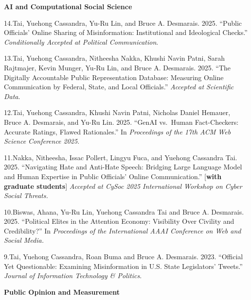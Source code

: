 \documentclass[10.5pt,]{article}
\providecommand{\tightlist}{%
	\setlength{\itemsep}{0pt}\setlength{\parskip}{0pt}}
\renewenvironment{itemize}{
	\begin{list}{}{
			\setlength{\leftmargin}{1.5em}
		}
	}{
	\end{list}
}
\begin{document}
\begin{itemize}
\tightlist
\item
  \textbf{AI and Computational Social Science}

  \begin{itemize}
  \tightlist
  \item
    14.Tai, Yuehong Cassandra, Yu-Ru Lin, and Bruce A. Desmarais. 2025.
    ``Public Oﬀicials' Online Sharing of Misinformation: Institutional
    and Ideological Checks.'' \emph{Conditionally Accepted at Political
    Communication}.
  \item
    13.Tai, Yuehong Cassandra, Nitheesha Nakka, Khushi Navin Patni,
    Sarah Rajtmajer, Kevin Munger, Yu-Ru Lin, and Bruce A. Desmarais.
    2025. ``The Digitally Accountable Public Representation Database:
    Measuring Online Communication by Federal, State, and Local
    Oﬀicials.'' \emph{Accepted at Scientific Data}.
  \item
    12.Tai, Yuehong Cassandra, Khushi Navin Patni, Nicholas Daniel
    Hemauer, Bruce A. Desmarais, and Yu-Ru Lin. 2025. ``GenAI vs.~Human
    Fact-Checkers: Accurate Ratings, Flawed Rationales.'' In
    \emph{Proceedings of the 17th ACM Web Science Conference 2025}.
  \item
    11.Nakka, Nitheesha, Issac Pollert, Lingyu Fuca, and Yuehong
    Cassandra Tai. 2025. ``Navigating Hate and Anti-Hate Speech:
    Bridging Large Language Model and Human Expertise in Public
    Oﬀicials' Online Communication.'' {[}\textbf{with graduate
    students}{]} \emph{Accepted at CySoc 2025 International Workshop on
    Cyber Social Threats.}
  \item
    10.Biswas, Ahana, Yu-Ru Lin, Yuehong Cassandra Tai and Bruce A.
    Desmarais. 2025. ``Political Elites in the Attention Economy:
    Visibility Over Civility and Credibility?'' In \emph{Proceedings of
    the International AAAI Conference on Web and Social Media.}
  \item
    9.Tai, Yuehong Cassandra, Roan Buma and Bruce A. Desmarais. 2023.
    ``Oﬀicial Yet Questionable: Examining Misinformation in U.S. State
    Legislators' Tweets.'' \emph{Journal of Information Technology \&
    Politics}.
  \end{itemize}
\item
  \textbf{Public Opinion and Measurement}


\end{itemize}
\end{document}
